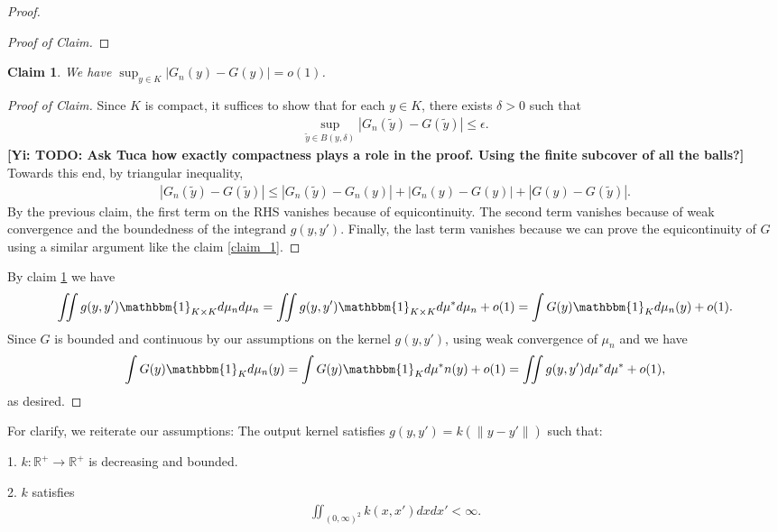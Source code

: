 \documentclass[10pt]{article}
\newcommand{\norm}[1]{\left\lVert#1\right\rVert}
\newcommand{\gy}[1]{\textbf{\color{gred}[Yi: #1]}}
\newtheorem{claim}{\bf Claim}
\newenvironment{Proof of lemma}{\noindent{\bf Proof of Lemma}}{\hfill$\Box$\newline}
\newenvironment{Proof of claim}{\noindent{\bf Proof of claim}}{\hfill$\Box$\newline}
\newenvironment{Proof of theorem}{\noindent{\bf Proof of Theorem}}{\hfill\scriptsize{$\Box$}\newline}
\newenvironment{Proof of theorems}{\noindent{\bf Proof of Theorems}}{\hfill$\Box$\newline}
\newenvironment{Proof of proposition}{\noindent{\bf Proof of Proposition}}{\hfill$\Box$\newline}
\newenvironment{Proof of propositions}{\noindent{\bf Proof of Propositions}}{\hfill$\Box$\newline}
\newenvironment{Proof of exercise}{\noindent{\it Proof of Exercise:}}{\hfill$\Box$}
\numberwithin{equation}{section}
\begin{document}
\begin{proof}
\begin{proof}[Proof of Claim]
    \end{proof}
    \begin{claim} \label{claim_2}
        We have $\sup_{y \in K}|G_n(y)-G(y)|=o(1)$.
    \end{claim}
    \begin{proof}[Proof of Claim]
        Since $K$ is compact, it suffices to show that for each $y \in K$, there exists $\delta>0$ such that
        \begin{align}
            \sup_{\tilde{y}\in B(y,\delta)} |G_n(\tilde{y})-G(\tilde{y})| \leq \epsilon.
        \end{align}
        \gy{TODO: Ask Tuca how exactly compactness plays a role in the proof. Using the finite subcover of all the balls?}
        Towards this end, by triangular inequality,
        \begin{align}
            |G_n(\tilde{y})-G(\tilde{y})| \leq |G_n(\tilde{y})-G_n(y)|+|G_n(y)-G(y)|+|G(y)-G(\tilde{y})|.
        \end{align}
        By the previous claim, the first term on the RHS vanishes because of equicontinuity. The second term vanishes because of weak convergence and the boundedness of the integrand $g(y,y')$. Finally, the last term vanishes because we can prove the equicontinuity of $G$ using a similar argument like the claim \ref{claim_1}.
    \end{proof}
    By claim \ref{claim_2} we have
    \begin{align}
        \iint g(y,y') \mathbbm{1}_{K \times K} d\mu_n d\mu_n = \iint g(y,y') \mathbbm{1}_{K \times K} d\mu^* d\mu_n +o(1) = \int G(y) \mathbbm{1}_K d\mu_n(y)+o(1).
    \end{align}
    Since $G$ is bounded and continuous by our assumptions on the kernel $g(y,y')$, using weak convergence of $\mu_n$ and we have
    \begin{align}
        \int G(y) \mathbbm{1}_K d\mu_n(y) = \int G(y) \mathbbm{1}_K d\mu^*n(y) + o(1) = \iint g(y,y')d\mu^* d\mu^* + o(1),
    \end{align}
    as desired.
\end{proof}
For clarify, we reiterate our assumptions:
The output kernel satisfies $g(y,y') = k (\norm{y-y'})$ such that:

1. $k: \mathbb{R}^+ \to \mathbb{R}^+$ is decreasing and bounded.

2. $k$ satisfies
\begin{align}
    \iint_{(0,\infty)^2} k(x,x') dxdx' < \infty.
\end{align}
\end{document}
